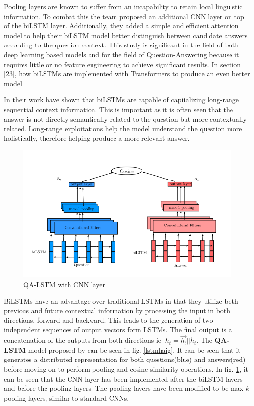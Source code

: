 \documentclass[a4paper,12pt]{report}
\begin{document}
            Pooling layers are known to suffer from an incapability to retain local linguistic information. To combat this the team proposed an additional CNN layer on top of the biLSTM layer. Additionally, they added a simple and efficient attention model to help their biLSTM model better distinguish between candidate answers according to the question context. This study is significant in the field of both deep learning based models and for the field of Question-Answering because it requires little or no feature engineering to achieve significant results. In section \ref{23}, how biLSTMs are implemented with Transformers to produce an even better model.

            In their work \citep{lstmhaighextractive} have shown that biLSTMs are capable of capitalizing long-range sequential context information. This is important as it is often seen that the answer is not directly semantically related to the question but more contextually related. Long-range exploitations help the model understand the question more holistically, therefore helping produce a more relevant answer.


		   \begin{figure}
				\centering
				\includegraphics[scale=0.35]{../images/lstm-bilstmhaigcnn.png}
				\caption{QA-LSTM with CNN layer \citep{lstmhaighextractive}}\label{lstmhaigcnn}
			\end{figure}

             BiLSTMs have an advantage over traditional LSTMs in that they utilize both previous and future contextual information by processing the input in both directions, forward and backward. This leads to the generation of two independent sequences of output vectors form LSTMs. The final output is a concatenation  of the outputs from both directions ie. $h_t= \overrightarrow{h_t} || \overleftarrow{h_t} $.
             The \textbf{QA-LSTM} model  proposed by \citep{lstmhaighextractive} can be seen in fig. \ref{lstmhaig}. It can be seen that it generates a distributed representation for both questions(blue) and answers(red) before moving on to perform pooling and cosine similarity operations.
            In fig. \ref{lstmhaigcnn}, it can be seen that the CNN layer has been implemented after the biLSTM layers and before the pooling layers. The pooling layers have been modified to be max-$ k $ pooling layers, similar to standard CNNs.
\end{document}
